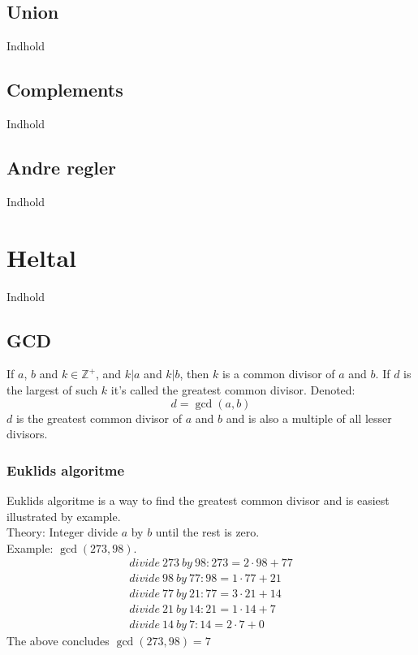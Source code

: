 \documentclass[a4paper]{article}
\newcommand{\Integers}{\mathbb{Z}}
\begin{document}
  \subsection{Union}
    Indhold
  \subsection{Complements}
    Indhold
  \subsection{Andre regler}
    Indhold
\section{Heltal}
  Indhold
  \subsection{GCD}
    If $a$, $b$ and $k \in \Integers^+$, and $k | a$ and $k | b$, then $k$ is a common divisor of $a$ and $b$. If $d$ is the largest of such $k$ it's called the greatest common divisor. Denoted:
    $$d = \operatorname{gcd}(a, b)$$
    $d$ is the greatest common divisor of $a$ and $b$ and is also a multiple of all lesser divisors.
    \subsubsection{Euklids algoritme}
     Euklids algoritme is a way to find the greatest common divisor and is easiest illustrated by example.\\
     Theory: Integer divide $a$ by $b$ until the rest is zero.\\
     Example: $\operatorname{gcd}(273, 98)$.%
     \begin{eqnarray}
      divide\ 273\ by\ 98:	273 = 2 \cdot 98 + 77\\
      divide\ 98\ by\ 77:	98 = 1 \cdot 77 + 21\\
      divide\ 77\ by\ 21:	77 = 3 \cdot 21 + 14\\
      divide\ 21\ by\ 14:	21 = 1 \cdot 14 + 7\\
      divide\ 14\ by\ 7:	14 = 2 \cdot 7 + 0
     \end{eqnarray}
     The above concludes $\operatorname{gcd}(273, 98) = 7$
\end{document}
